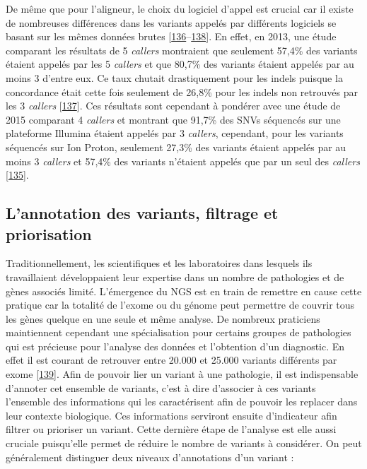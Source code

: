 \documentclass[12pt,twoside]{reedthesis}
\theoremstyle{definition}
\theoremstyle{definition}
\theoremstyle{remark}
\begin{document}
  De même que pour l'aligneur, le choix du logiciel d'appel est crucial
  car il existe de nombreuses différences dans les variants appelés par
  différents logiciels se basant sur les mêmes données brutes
  {[}\protect\hyperlink{ref-Baes2014}{136}--\protect\hyperlink{ref-Rosenfeld2012}{138}{]}.
  En effet, en 2013, une étude comparant les résultats de 5 \emph{callers}
  montraient que seulement 57,4\% des variants étaient appelés par les 5
  \emph{callers} et que 80,7\% des variants étaient appelés par au moins 3
  d'entre eux. Ce taux chutait drastiquement pour les indels puisque la
  concordance était cette fois seulement de 26,8\% pour les indels non
  retrouvés par les 3 \emph{callers}
  {[}\protect\hyperlink{ref-ORawe2013}{137}{]}. Ces résultats sont
  cependant à pondérer avec une étude de 2015 comparant 4 \emph{callers}
  et montrant que 91,7\% des SNVs séquencés sur une plateforme Illumina
  étaient appelés par 3 \emph{callers}, cependant, pour les variants
  séquencés sur Ion Proton, seulement 27,3\% des variants étaient appelés
  par au moins 3 \emph{callers} et 57,4\% des variants n'étaient appelés
  que par un seul des \emph{callers}
  {[}\protect\hyperlink{ref-Hwang2015}{135}{]}.
  
  \newpage
  
  \subsection{L'annotation des variants, filtrage et
  priorisation}\label{lannotation-des-variants-filtrage-et-priorisation}
  
  Traditionnellement, les scientifiques et les laboratoires dans lesquels
  ils travaillaient développaient leur expertise dans un nombre de
  pathologies et de gènes associés limité. L'émergence du NGS est en train
  de remettre en cause cette pratique car la totalité de l'exome ou du
  génome peut permettre de couvrir tous les gènes quelque en une seule et
  même analyse. De nombreux praticiens maintiennent cependant une
  spécialisation pour certains groupes de pathologies qui est précieuse
  pour l'analyse des données et l'obtention d'un diagnostic. En effet il
  est courant de retrouver entre 20.000 et 25.000 variants différents par
  exome {[}\protect\hyperlink{ref-Gonzaga-Jauregui2012}{139}{]}. Afin de
  pouvoir lier un variant à une pathologie, il est indispensable d'annoter
  cet ensemble de variants, c'est à dire d'associer à ces variants
  l'ensemble des informations qui les caractérisent afin de pouvoir les
  replacer dans leur contexte biologique. Ces informations serviront
  ensuite d'indicateur afin filtrer ou prioriser un variant. Cette
  dernière étape de l'analyse est elle aussi cruciale puisqu'elle permet
  de réduire le nombre de variants à considérer. On peut généralement
  distinguer deux niveaux d'annotations d'un variant :
  
\end{document}
